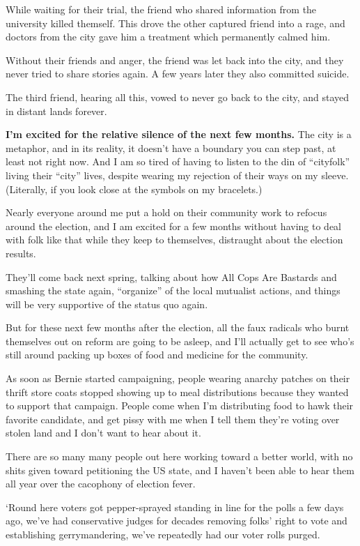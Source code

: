 \documentclass[11pt]{article}
\begin{document}
\begin{itemize}
While waiting for their trial, the friend who shared information from the university killed themself. This drove the other captured friend into a rage, and doctors from the city gave him a treatment which permanently calmed him.

Without their friends and anger, the friend was let back into the city, and they never tried to share stories again. A few years later they also committed suicide.

The third friend, hearing all this, vowed to never go back to the city, and stayed in distant lands forever.

\textbf{I’m excited for the relative silence of the next few months.} The city is a metaphor, and in its reality, it doesn’t have a boundary you can step past, at least not right now. And I am so tired of having to listen to the din of “cityfolk” living their “city” lives, despite wearing my rejection of their ways on my sleeve. (Literally, if you look close at the symbols on my bracelets.)

Nearly everyone around me put a hold on their community work to refocus around the election, and I am excited for a few months without having to deal with folk like that while they keep to themselves, distraught about the election results.

They'll come back next spring, talking about how All Cops Are Bastards and smashing the state again, “organize” of the local mutualist actions, and things will be very supportive of the status quo again.

But for these next few months after the election, all the faux radicals who burnt themselves out on reform are going to be asleep, and I'll actually get to see who's still around packing up boxes of food and medicine for the community.

As soon as Bernie started campaigning, people wearing anarchy patches on their thrift store coats stopped showing up to meal distributions because they wanted to support that campaign. People come when I'm distributing food to hawk their favorite candidate, and get pissy with me when I tell them they're voting over stolen land and I don't want to hear about it.

There are so many many people out here working toward a better world, with no shits given toward petitioning the US state, and I haven’t been able to hear them all year over the cacophony of election fever.

‘Round here voters got pepper-sprayed standing in line for the polls a few days ago, we've had conservative judges for decades removing folks' right to vote and establishing gerrymandering, we've repeatedly had our voter rolls purged.


\end{itemize}
\end{document}

